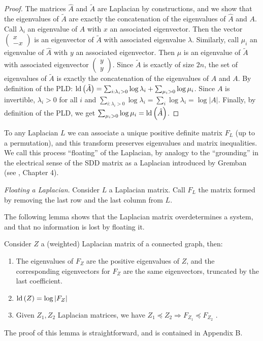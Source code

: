\begin{proof}
The matrices $\hat{A}$ and $\tilde{A}$ are Laplacian by constructions,
and we show that the eigenvalues of $\tilde{A}$ are exactly the concatenation
of the eigenvalues of $\hat{A}$ and $A$. Call $\lambda_{i}$ an
eigenvalue of $A$ with $x$ an associated eigenvector. Then the vector
$\left(\begin{array}{c}
x\\
-x
\end{array}\right)$ is an eigenvector of $\tilde{A}$ with associated eigenvalue $\lambda$.
Similarly, call $\mu_{i}$ an eigenvalue of $\hat{A}$ with $y$ an
associated eigenvector. Then $\mu$ is an eigenvalue of $\tilde{A}$
with associated eigenvector $\left(\begin{array}{c}
y\\
y
\end{array}\right)$. Since $\tilde{A}$ is exactly of size $2n$, the set of eigenvalues
of $\tilde{A}$ is exactly the concatenation of the eigenvalues of
$\hat{A}$ and $A$. By definition of the PLD: $\text{\textnormal{ld}}\left(\tilde{A}\right)=\sum_{i:\lambda_{i}>0}\log\lambda_{i}+\sum_{\mu_{i}>0}\log\mu_{i}$.
Since $A$ is invertible, $\lambda_{i}>0$ for all $i$ and $\sum_{i:\lambda_{i}>0}\log\lambda_{i}=\sum_{i}\log\lambda_{i}=\log\left|A\right|$.
Finally, by definition of the PLD, we get $\sum_{\mu_{i}>0}\log\mu_{i}=\text{\textnormal{ld}}\left(\hat{A}\right)$. 
\end{proof}
To any Laplacian $L$ we can associate a unique positive definite
matrix $F_{L}$ (up to a permutation), and this transform preserves
eigenvalues and matrix inequalities. We call this process ``floating''
of the Laplacian, by analogy to the ``grounding'' in the electrical
sense of the SDD matrix as a Laplacian introduced by Gremban (see
\cite{Gremban1996}, Chapter 4). 
\begin{definition}
\emph{Floating a Laplacian}. Consider $L$ a Laplacian matrix. Call
$F_{L}$ the matrix formed by removing the last row and the last column
from $L$. 
\end{definition}
The following lemma shows that the Laplacian matrix overdetermines
a system, and that no information is lost by floating it. 
\begin{lemma}
\label{lem:floating-properties}Consider $Z$ a (weighted) Laplacian
matrix of a connected graph, then: 
\begin{enumerate}
\item The eigenvalues of $F_{Z}$ are the positive eigenvalues of $Z$,
and the corresponding eigenvectors for $F_{Z}$ are the same eigenvectors,
truncated by the last coefficient. 
\item $\text{\textnormal{ld}}\left(Z\right)=\log\left|F_{Z}\right|$ 
\item Given $Z_{1},Z_{2}$ Laplacian matrices, we have $Z_{1}\preceq Z_{2}\Rightarrow F_{Z_{1}}\preceq F_{Z_{2}}$
. 
\end{enumerate}
\end{lemma}
The proof of this lemma is straightforward, and is contained in Appendix
B.

